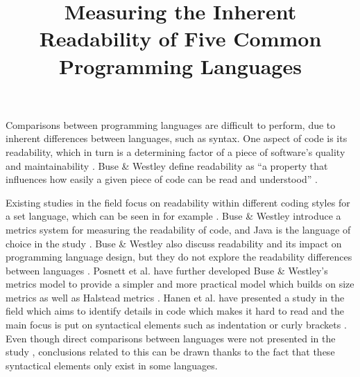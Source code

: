 \documentclass[times, 10pt,twocolumn]{IEEEtran}
\begin{document}
\title{Measuring the Inherent Readability of Five Common Programming Languages}

\author{


}
\maketitle
\thispagestyle{empty}



Comparisons between programming languages are difficult to perform, due to inherent differences between languages, such as syntax. One aspect of code is its readability, which in turn is a determining factor of a piece of software's quality and maintainability \cite{aggarwal2002integrated, elshoff1982improving}. Buse \& Westley define readability as ``a property that influences how easily a given piece of code can be read and understood'' \cite{buse2010learning}. 
\newline

Existing studies in the field focus on readability within different coding styles for a set language, which can be seen in for example \cite{buse2010learning}. Buse \& Westley introduce a metrics system for measuring the readability of code, and Java is the language of choice in the study \cite{buse2010learning}. Buse \& Westley also discuss readability and its impact on programming language design, but they do not explore the readability differences between languages \cite{buse2010learning}. Posnett et al. \cite{posnett2011simpler} have further developed Buse \& Westley's metrics model to provide a simpler and more practical model which builds on size metrics as well as Halstead metrics \cite{halstead1977elements}. Hanen et al. have presented a study in the field which aims to identify details in code which makes it hard to read and the main focus is put on syntactical elements such as indentation or curly brackets \cite{hansen2013makes}. Even though direct comparisons between languages were not presented in the study \cite{hansen2013makes}, conclusions related to this can be drawn thanks to the fact that these syntactical elements only exist in some languages. 
\newline
\end{document}

